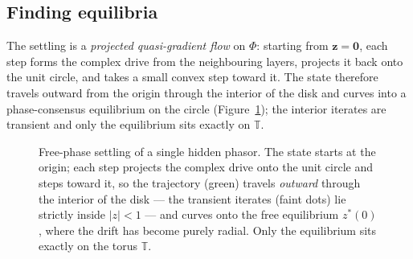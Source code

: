 \documentclass[11pt]{article}
\newcommand{\R}{\mathbb{R}}
\newcommand{\T}{\mathbb{T}}
\theoremstyle{definition}
\DeclareMathOperator{\Real}{Re}
\DeclareMathOperator{\Imag}{Im}
\begin{document}
\subsection{Finding equilibria}
The settling is a \emph{projected quasi-gradient flow} on $\Phi$:
starting from $\bm{z}=\bm{0}$, each step forms the complex drive from
the neighbouring layers, projects it back onto the unit circle, and
takes a small convex step toward it.  The state therefore travels
outward from the origin through the interior of the disk and curves
into a phase-consensus equilibrium on the circle
(Figure~\ref{fig:freesettle}); the interior iterates are transient and
only the equilibrium sits exactly on $\T$.

\begin{figure}[htbp]
\centering
{}
\caption{Free-phase settling of a single hidden phasor.  The state
starts at the origin; each step projects the complex drive onto the
unit circle and steps toward it, so the trajectory (green) travels
\emph{outward} through the interior of the disk --- the transient
iterates (faint dots) lie strictly inside $|z|<1$ --- and curves onto
the free equilibrium $z^*(0)$, where the drift has become purely
radial.  Only the equilibrium sits exactly on the torus $\T$.}
\label{fig:freesettle}
\end{figure}
\end{document}
